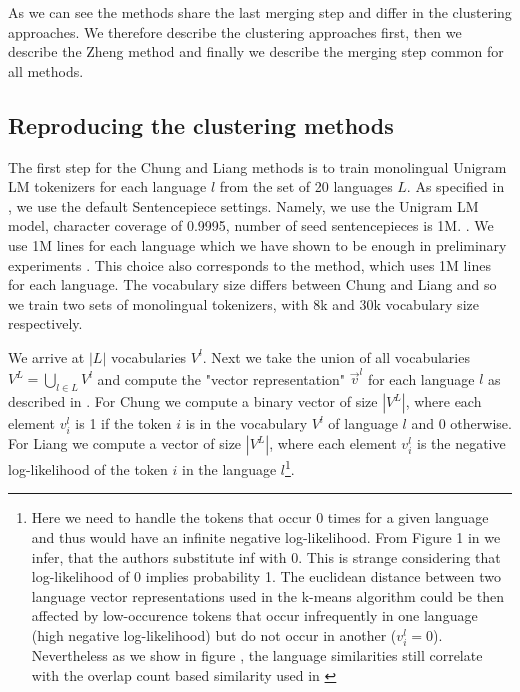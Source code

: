 As we can see the methods share the last merging step and differ in the clustering approaches. We therefore describe the clustering approaches first, then we describe the Zheng method and finally we describe the merging step common for all methods.

\subsection{Reproducing the clustering methods}

The first step for the Chung and Liang methods is to train monolingual Unigram LM tokenizers for each language $l$ from the set of 20 languages $L$. As specified in \citet{chung_improving_2020}, we use the default Sentencepiece settings. Namely, we use the Unigram LM model, character coverage of 0.9995, number of seed sentencepieces is 1M. . We use 1M lines for each language which we have shown to be enough in preliminary experiments . This choice also corresponds to the \citet{zheng_allocating_2021} method, which uses 1M lines for each language. The vocabulary size differs between Chung and Liang and so we train two sets of monolingual tokenizers, with 8k and 30k vocabulary size respectively.

We arrive at $|L|$ vocabularies $V^l$. Next we take the union of all vocabularies $V^L = \bigcup_{l \in L} V^l$ and compute the "vector representation" $\vec{v}^l$ for each language $l$ as described in . For Chung we compute a binary vector of size $|V^L|$, where each element $v^l_i$ is 1 if the token $i$ is in the vocabulary $V^l$ of language $l$ and 0 otherwise. For Liang we compute a vector of size $|V^L|$, where each element $v^l_i$ is the negative log-likelihood of the token $i$ in the language $l$\footnote{Here we need to handle the tokens that occur 0 times for a given language and thus would have an infinite negative log-likelihood. From Figure 1 in \cite{liang_xlm-v_2023} we infer, that the authors substitute inf with 0. This is strange considering that log-likelihood of 0 implies probability 1. The euclidean distance between two language vector representations used in the k-means algorithm could be then affected by low-occurence tokens that occur infrequently in one language (high negative log-likelihood) but do not occur in another ($v^l_i = 0$). Nevertheless as we show in figure , the language similarities still correlate with the overlap count based similarity used in \cite{chung_improving_2020}}.

